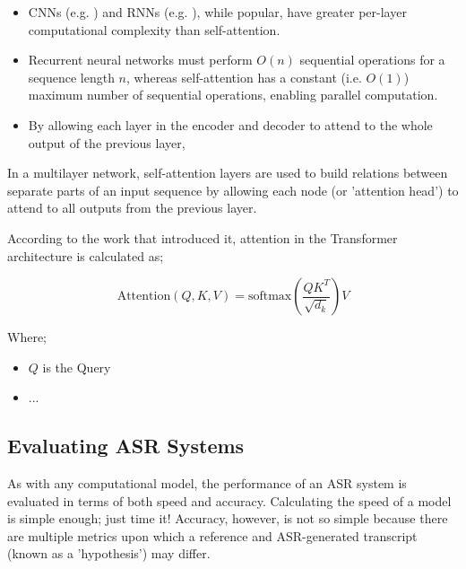 \begin{itemize}
        \item CNNs (e.g. \cite{zeghidour2018fully}) and RNNs (e.g. \cite{graves2014towards}), while popular, have greater per-layer computational complexity than self-attention\cite{vaswani2017attention}.
        \item Recurrent neural networks must perform $O(n)$ sequential operations for a sequence length $n$, whereas self-attention has a constant (i.e. $O(1)$) maximum number of sequential operations, enabling parallel computation\cite{vaswani2017attention}.
        \item By allowing each layer in the encoder and decoder to attend to the whole output of the previous layer, 
\end{itemize}

In a multilayer network, self-attention layers are used to build relations between separate parts of an input sequence by allowing each node (or 'attention head'\cite{shaw2018self}) to attend to all outputs from the previous layer.

According to the work that introduced it\cite{vaswani2017attention}, attention in the Transformer architecture is calculated as;

\[ \text{Attention}(Q,K,V) = \text{softmax}(\frac{QK^T}{\sqrt{d_k}})V \]

Where;

\begin{itemize}
        \item $Q$ is the Query
        \item ...
\end{itemize}



\subsection{Evaluating ASR Systems}
As with any computational model, the performance of an ASR system is evaluated in terms of both speed and accuracy.
Calculating the speed of a model is simple enough; just time it!
Accuracy, however, is not so simple because there are multiple metrics upon which a reference and ASR-generated transcript (known as a 'hypothesis') may differ.

